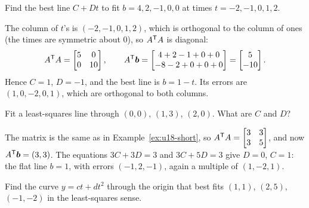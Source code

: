 \begin{exercise}\label{ex:u18-ex3}
Find the best line $C+Dt$ to fit $b=4,2,-1,0,0$ at times $t=-2,-1,0,1,2$.
\end{exercise}

\begin{solution}
The column of $t$'s is $(-2,-1,0,1,2)$, which is orthogonal to the column of ones (the times
are symmetric about $0$), so $A^{\mathsf{T}} A$ is diagonal:
\[
  A^{\mathsf{T}} A=\begin{bmatrix}5&0\\0&10\end{bmatrix},\qquad
  A^{\mathsf{T}}\boldsymbol{b}=\begin{bmatrix}4+2-1+0+0\\-8-2+0+0+0\end{bmatrix}=\begin{bmatrix}5\\-10\end{bmatrix}.
\]
Hence $C=1$, $D=-1$, and the best line is $b=1-t$. Its errors are $(1,0,-2,0,1)$, which are
orthogonal to both columns.
\end{solution}

\begin{exercise}\label{ex:u18-short-practice}
Fit a least-squares line through $(0,0)$, $(1,3)$, $(2,0)$. What are $C$ and $D$?
\end{exercise}

\begin{solution}
The matrix is the same as in Example~\ref{ex:u18-short}, so $A^{\mathsf{T}} A=\begin{bmatrix}3&3\\3&5\end{bmatrix}$,
and now $A^{\mathsf{T}}\boldsymbol{b}=(3,3)$. The equations $3C+3D=3$ and $3C+5D=3$ give $D=0$, $C=1$: the flat
line $b=1$, with errors $(-1,2,-1)$, again a multiple of $(1,-2,1)$.
\end{solution}

\begin{exercise}\label{ex:u18-quad}
Find the curve $y=ct+dt^2$ through the origin that best fits $(1,1)$, $(2,5)$, $(-1,-2)$ in
the least-squares sense.
\end{exercise}

